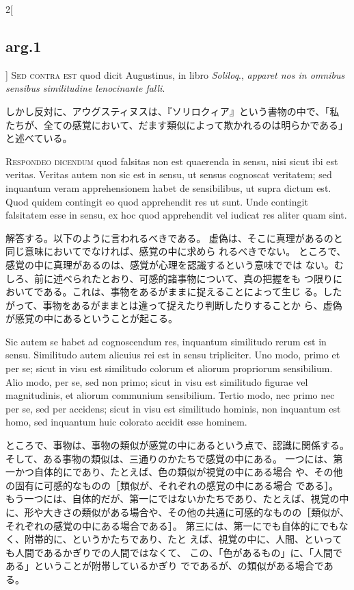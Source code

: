 \documentclass[paper=a4paper,fontsize=10pt,jafontsize=9pt,titlepage]{jlreq}
\begin{document}
\begin{paracol}{2}[\subsection{arg.1}]
{\scshape  Sed contra est} quod dicit Augustinus, in libro {\itshape Soliloq}.,
{\itshape apparet nos in omnibus sensibus similitudine lenocinante falli}.

\switchcolumn

しかし反対に、アウグスティヌスは、『ソリロクィア』という書物の中で、「私
 たちが、全ての感覚において、だます類似によって欺かれるのは明らかである」
 と述べている。



{\scshape Respondeo dicendum} quod falsitas non est quaerenda in sensu,
nisi sicut ibi est veritas. Veritas autem non sic est in sensu, ut
sensus cognoscat veritatem; sed inquantum veram apprehensionem habet de
sensibilibus, ut supra dictum est. Quod quidem contingit eo quod
apprehendit res ut sunt. Unde contingit falsitatem esse in sensu, ex hoc
quod apprehendit vel iudicat res aliter quam sint.

\switchcolumn

解答する。以下のように言われるべきである。
虚偽は、そこに真理があるのと同じ意味においてでなければ、感覚の中に求めら
 れるべきでない。
ところで、感覚の中に真理があるのは、感覚が心理を認識するという意味ででは
 ない。むしろ、前に述べられたとおり、可感的諸事物について、真の把握をも
 つ限りにおいてである。これは、事物をあるがままに捉えることによって生じ
 る。したがって、事物をあるがままとは違って捉えたり判断したりすることか
 ら、虚偽が感覚の中にあるということが起こる。

\switchcolumn*


Sic autem se habet ad
cognoscendum res, inquantum similitudo rerum est in sensu. Similitudo
autem alicuius rei est in sensu tripliciter. Uno modo, primo et per se;
sicut in visu est similitudo colorum et aliorum propriorum
sensibilium. Alio modo, per se, sed non primo; sicut in visu est
similitudo figurae vel magnitudinis, et aliorum communium
sensibilium. Tertio modo, nec primo nec per se, sed per accidens; sicut
in visu est similitudo hominis, non inquantum est homo, sed inquantum
huic colorato accidit esse hominem.

\switchcolumn

ところで、事物は、事物の類似が感覚の中にあるという点で、認識に関係する。
 そして、ある事物の類似は、三通りのかたちで感覚の中にある。
一つには、第一かつ自体的にであり、たとえば、色の類似が視覚の中にある場合
 や、その他の固有に可感的なものの［類似が、それぞれの感覚の中にある場合
 である］。
もう一つには、自体的だが、第一にではないかたちであり、たとえば、視覚の中
 に、形や大きさの類似がある場合や、その他の共通に可感的なものの［類似が、
 それぞれの感覚の中にある場合である］。
第三には、第一にでも自体的にでもなく、附帯的に、というかたちであり、たと
 えば、視覚の中に、人間、といっても人間であるかぎりでの人間ではなくて、
 この、「色があるもの」に、「人間である」ということが附帯しているかぎり
 でであるが、の類似がある場合である。


\end{paracol}
\end{document}
